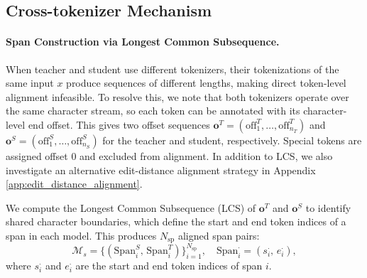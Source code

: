 \documentclass{article} %
\theoremstyle{definition}
\theoremstyle{remark}
\begin{document}
\subsection{Cross-tokenizer Mechanism}


\paragraph{Span Construction via Longest Common Subsequence.}
When teacher and student use different tokenizers, their tokenizations of the same input $x$ produce sequences of different lengths, making direct token-level alignment infeasible. To
resolve this, we note that both tokenizers operate over the same character stream, so each
token can be annotated with its character-level end offset. This gives two offset sequences $\mathbf{o}^T = (\mathrm{off}^T_1, \ldots, \mathrm{off}^T_{n_T})$ and $\mathbf{o}^S = (\mathrm{off}^S_1, \ldots, \mathrm{off}^S_{n_S})$ for the teacher and student, respectively. Special tokens are assigned offset $0$ and excluded from alignment. In addition to LCS, we also investigate an alternative edit-distance alignment strategy in Appendix \ref{app:edit_distance_alignment}.

We compute the Longest Common Subsequence (LCS) of $\mathbf{o}^T$ and $\mathbf{o}^S$ to identify shared character boundaries, which define the start and end token indices of a span
in each model. This produces $N_\mathrm{sp}$ aligned span pairs:
\begin{equation}
    \mathcal{M}_s = \bigl\{(\mathrm{Span}^S_i,\, \mathrm{Span}^T_i)\bigr\}_{i=1}^{N_\mathrm{sp}},
    \quad \mathrm{Span}^\cdot_i = (s^\cdot_i,\, e^\cdot_i),
\end{equation}
where $s^\cdot_i$ and $e^\cdot_i$ are the start and end token indices of span $i$. 
\end{document}
